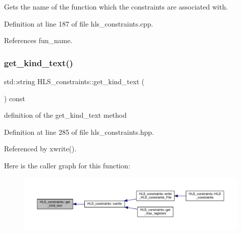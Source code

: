 Gets the name of the function which the constraints are associated with. 



Definition at line 187 of file hls\+\_\+constraints.\+cpp.



References fun\+\_\+name.

\mbox{\label{classHLS__constraints_a48f7cc80f45d781e815dfc6e86c238ea}} 
\subsubsection{\texorpdfstring{get\+\_\+kind\+\_\+text()}{get\_kind\_text()}}
{\footnotesize\ttfamily std\+::string H\+L\+S\+\_\+constraints\+::get\+\_\+kind\+\_\+text (\begin{DoxyParamCaption}{ }\end{DoxyParamCaption}) const\hspace{0.3cm}{\ttfamily [inline]}}



definition of the get\+\_\+kind\+\_\+text method 



Definition at line 285 of file hls\+\_\+constraints.\+hpp.



Referenced by xwrite().

Here is the caller graph for this function\+:
\nopagebreak
\begin{figure}[H]
\begin{center}
\leavevmode
\includegraphics[width=350pt]{dd/d96/classHLS__constraints_a48f7cc80f45d781e815dfc6e86c238ea_icgraph}
\end{center}
\end{figure}
\mbox{\label{classHLS__constraints_a4378dfa86b2203804067e93694ebaa6a}} 
